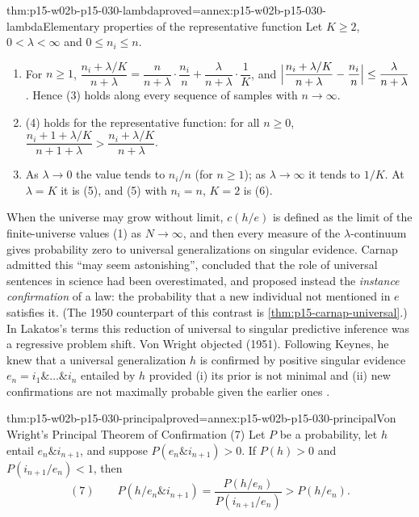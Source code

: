 \begin{hbtheorem}{thm:p15-w02b-p15-030-lambda}{proved=annex:p15-w02b-p15-030-lambda}{Elementary properties of the representative function}
Let \(K\geq2\), \(0<\lambda<\infty\) and \(0\leq n_i\leq n\).
\begin{enumerate}
\item For \(n\geq1\),
  \(\dfrac{n_i+\lambda/K}{n+\lambda}
   =\dfrac{n}{n+\lambda}\cdot\dfrac{n_i}{n}+\dfrac{\lambda}{n+\lambda}\cdot\dfrac1K\),
  and
  \(\Bigl|\dfrac{n_i+\lambda/K}{n+\lambda}-\dfrac{n_i}{n}\Bigr|\leq\dfrac{\lambda}{n+\lambda}\).
  Hence (3) holds along every sequence of samples with \(n\to\infty\).
\item (4) holds for the representative function: for all \(n\geq0\),
  \(\dfrac{n_i+1+\lambda/K}{n+1+\lambda}>\dfrac{n_i+\lambda/K}{n+\lambda}\).
\item As \(\lambda\to0\) the value tends to \(n_i/n\) (for \(n\geq1\)); as
  \(\lambda\to\infty\) it tends to \(1/K\). At \(\lambda=K\) it is (5),
  and (5) with \(n_i=n\), \(K=2\) is (6).
\end{enumerate}
\end{hbtheorem}

When the universe may grow without limit, \(c(h/e)\) is defined as the
limit of the finite-universe values (1) as \(N\to\infty\), and then every
measure of the \(\lambda\)-continuum gives probability zero to universal
generalizations on singular evidence. Carnap admitted this ``may seem
astonishing'', concluded that the role of universal sentences in science
had been overestimated, and proposed instead the \emph{instance
confirmation} of a law: the probability that a new individual not
mentioned in \(e\) satisfies it. (The 1950 counterpart of this contrast is
\cref{thm:p15-carnap-universal}.) In Lakatos's terms this reduction of
universal to singular predictive inference was a regressive problem
shift. Von Wright objected (1951). Following Keynes, he knew that a
universal generalization \(h\) is confirmed by positive singular
evidence \(e_n=i_1\&\ldots\&i_n\) entailed by \(h\) provided (i) its prior
is not minimal and (ii) new confirmations are not maximally probable
given the earlier ones \cite[p.~317]{Niiniluoto2011HintikkaProgramReading}.

\begin{hbtheorem}{thm:p15-w02b-p15-030-principal}{proved=annex:p15-w02b-p15-030-principal}{Von Wright's Principal Theorem of Confirmation (7)}
Let \(P\) be a probability, let \(h\) entail \(e_n\& i_{n+1}\), and
suppose \(P(e_n\&i_{n+1})>0\). If \(P(h)>0\) and \(P(i_{n+1}/e_n)<1\),
then
\[
 (7)\qquad P(h/e_n\&i_{n+1})=\frac{P(h/e_n)}{P(i_{n+1}/e_n)}>P(h/e_n).
\]
\end{hbtheorem}

